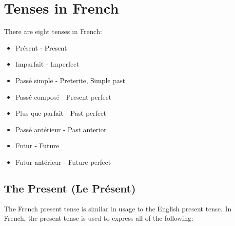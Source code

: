 \section{Tenses in French}

There are eight tenses in French:

\begin{itemize}
\item{Pr\'esent - Present}
\item{Imparfait - Imperfect}
\item{Pass\'e simple - Preterite, Simple past}
\item{Pass\'e compos\'e - Present perfect}
\item{Plus-que-parfait - Past perfect}
\item{Pass\'e ant\'erieur - Past anterior}
\item{Futur - Future}
\item{Futur ant\'erieur - Future perfect}
\end{itemize}


\subsection{The Present (Le Pr\'esent)}

The French present tense is similar in usage to the English present tense.
In French, the present tense is used to express all of the following:


